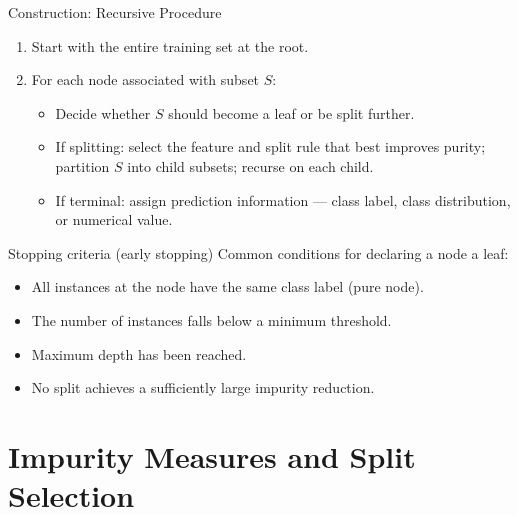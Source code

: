 \begin{frame}{Construction: Recursive Procedure}
  \begin{enumerate}
    \item Start with the \alert{entire training set} at the root.
    \item For each node associated with subset $S$:
      \begin{itemize}
        \item Decide whether $S$ should become a \alert{leaf} or be split further.
        \item If splitting: select the feature and split rule that best improves purity; partition
              $S$ into child subsets; recurse on each child.
        \item If terminal: assign prediction information — class label, class distribution, or
              numerical value.
      \end{itemize}
  \end{enumerate}
  \vspace{0.4em}
  \begin{block}{Stopping criteria (early stopping)}
    Common conditions for declaring a node a leaf:
    \begin{itemize}
      \item All instances at the node have the same class label (pure node).
      \item The number of instances falls below a minimum threshold.
      \item Maximum depth has been reached.
      \item No split achieves a sufficiently large impurity reduction.
    \end{itemize}
  \end{block}
\end{frame}

\section{Impurity Measures and Split Selection}

